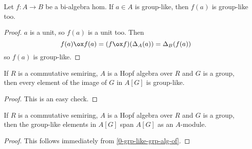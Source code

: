 \begin{lemma}
  \label{0-grp-like-map}
  \leanok

  Let $f : A \to B$ be a bi-algebra hom. If $a \in A$ is group-like, then $f(a)$ is group-like too.
\end{lemma}
\begin{proof}
  \uses{}
  \leanok

  $a$ is a unit, so $f(a)$ is a unit too. Then
  \[
    f(a) \ox f(a) = (f \ox f)(\Delta_A(a)) = \Delta_B(f(a))
  \]
  so $f(a)$ is group-like.
\end{proof}


\begin{lemma}
  \label{0-grp-like-grp-alg-of}
  \leanok

  If $R$ is a commutative semiring, $A$ is a Hopf algebra over $R$ and
  $G$ is a group, then every element of the image of $G$ in $A[G]$ is group-like.
\end{lemma}
\begin{proof}
  \uses{}
  \leanok

  This is an easy check.
\end{proof}


\begin{lemma}
  \label{0-grp-like-grp-alg-span}
  \leanok

  If $R$ is a commutative semiring, $A$ is a Hopf algebra over $R$ and
  $G$ is a group, then the group-like elements in $A[G]$ span $A[G]$ as
  an $A$-module.

\end{lemma}
\begin{proof}
  \leanok

  This follows immediately from \ref{0-grp-like-grp-alg-of}.
\end{proof}


